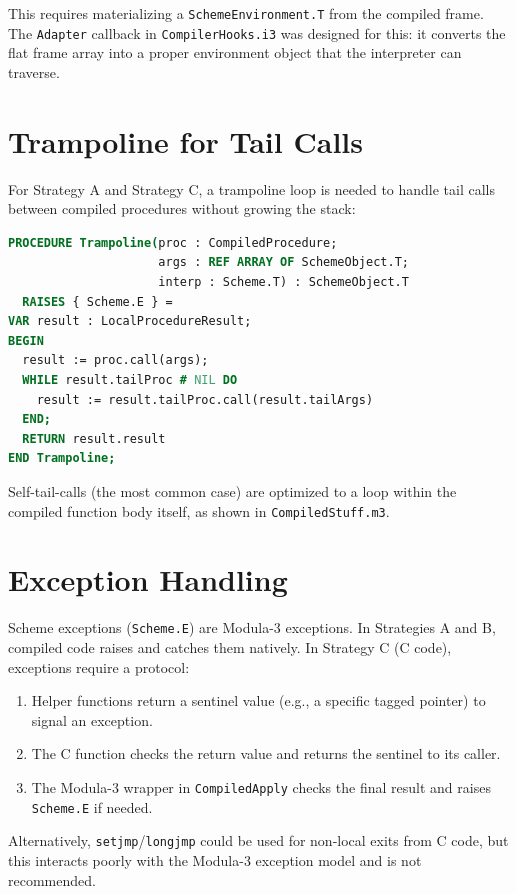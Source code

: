 \documentclass[12pt]{report}
\begin{document}
This requires materializing a \texttt{SchemeEnvironment.T} from the
compiled frame.  The \texttt{Adapter} callback in
\texttt{CompilerHooks.i3} was designed for this: it converts the flat
frame array into a proper environment object that the interpreter
can traverse.

\section{Trampoline for Tail Calls}

For Strategy A and Strategy C, a trampoline loop is needed to handle
tail calls between compiled procedures without growing the stack:

\begin{lstlisting}[language=Modula3]
PROCEDURE Trampoline(proc : CompiledProcedure;
                     args : REF ARRAY OF SchemeObject.T;
                     interp : Scheme.T) : SchemeObject.T
  RAISES { Scheme.E } =
VAR result : LocalProcedureResult;
BEGIN
  result := proc.call(args);
  WHILE result.tailProc # NIL DO
    result := result.tailProc.call(result.tailArgs)
  END;
  RETURN result.result
END Trampoline;
\end{lstlisting}

Self-tail-calls (the most common case) are optimized to a loop
within the compiled function body itself, as shown in
\texttt{CompiledStuff.m3}.

\section{Exception Handling}

Scheme exceptions (\texttt{Scheme.E}) are Modula-3 exceptions.
In Strategies A and B, compiled code raises and catches them
natively.  In Strategy C (C code), exceptions require a protocol:

\begin{enumerate}
\item Helper functions return a sentinel value (e.g., a specific
  tagged pointer) to signal an exception.
\item The C function checks the return value and returns the
  sentinel to its caller.
\item The Modula-3 wrapper in \texttt{CompiledApply} checks the
  final result and raises \texttt{Scheme.E} if needed.
\end{enumerate}

Alternatively, \texttt{setjmp}/\texttt{longjmp} could be used for
non-local exits from C code, but this interacts poorly with the
Modula-3 exception model and is not recommended.
\end{document}
